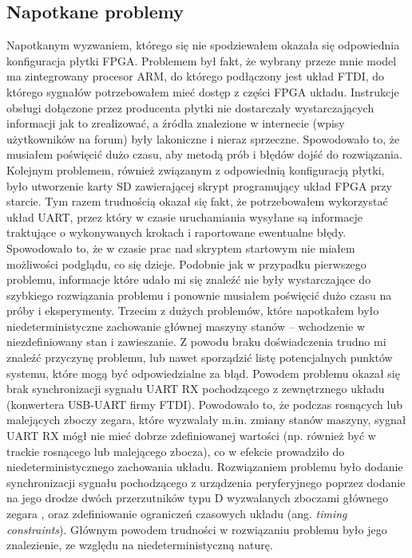 \subsection{Napotkane problemy}
Napotkanym wyzwaniem, którego się nie spodziewałem okazała się odpowiednia konfiguracja płytki FPGA. Problemem był fakt, że wybrany przeze mnie model ma zintegrowany procesor ARM, do którego podłączony jest układ FTDI, do którego sygnałów potrzebowałem mieć dostęp z części FPGA układu. Instrukcje obsługi dołączone przez producenta płytki nie dostarczały wystarczających informacji jak to zrealizować, a źródła znalezione w internecie (wpisy użytkowników na forum) były lakoniczne i nieraz sprzeczne. Spowodowało to, że musiałem poświęcić dużo czasu, aby metodą prób i błędów dojść do rozwiązania.
\newline
Kolejnym problemem, również związanym z odpowiednią konfiguracją płytki, było utworzenie karty SD zawierającej skrypt programujący układ FPGA przy starcie. Tym razem trudnością okazał się fakt, że potrzebowałem wykorzystać układ UART, przez który w czasie uruchamiania wysyłane są informacje traktujące o wykonywanych krokach i raportowane ewentualne błędy. Spowodowało to, że w czasie prac nad skryptem startowym nie miałem możliwości podglądu, co się dzieje. Podobnie jak w przypadku pierwszego problemu, informacje które udało mi się znaleźć nie były wystarczające do szybkiego rozwiązania problemu i ponownie musiałem poświęcić dużo czasu na próby i eksperymenty.
\newline
Trzecim z dużych problemów, które napotkałem było niedeterministyczne zachowanie głównej maszyny stanów -- wchodzenie w niezdefiniowany stan i zawieszanie. Z powodu braku doświadczenia trudno mi znaleźć przyczynę problemu, lub nawet sporządzić listę potencjalnych punktów systemu, które mogą być odpowiedzialne za błąd. Powodem problemu okazał się brak synchronizacji sygnału UART RX pochodzącego z zewnętrznego układu (konwertera USB-UART firmy FTDI). Powodowało to, że podczas rosnących lub malejących zboczy zegara, które wyzwalały m.in. zmiany stanów maszyny, sygnał UART RX mógł nie mieć dobrze zdefiniowanej wartości (np. również być w trackie rosnącego lub malejącego zbocza), co w efekcie prowadziło do niedeterministycznego zachowania układu. Rozwiązaniem problemu było dodanie synchronizacji sygnału pochodzącego z urządzenia peryferyjnego poprzez dodanie na jego drodze dwóch przerzutników typu D wyzwalanych zboczami głównego zegara \cite{altera-metastability, 2ff-synchronization}, oraz zdefiniowanie ograniczeń czasowych układu (ang. \textit{timing constraints}). Głównym powodem trudności w rozwiązaniu problemu było jego znalezienie, ze względu na niedeterministyczną naturę.


\newpage
